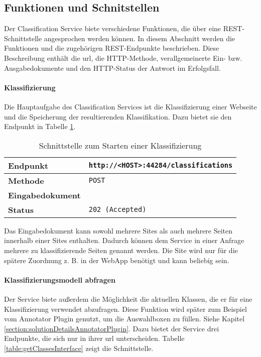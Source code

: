 \subsection{Funktionen und Schnitstellen}
    \label{section:solutionDetailsClassificationServiceFunctions}
    Der Classification Service biete verschiedene Funktionen,
    die über eine REST-Schnittstelle angesprochen werden können.
    In diesem Abschnitt werden die Funktionen und die zugehörigen
    REST-Endpunkte beschrieben.
    Diese Beschreibung enthält die \gls{url}, die HTTP-Methode,
    verallgemeinerte Ein- bzw. Ausgabedokumente und den HTTP-Status
    der Antwort im Erfolgsfall.

    \paragraph{Klassifizierung}
    Die Hauptaufgabe des Classification Services ist die Klassifizierung einer Webseite
    und die Speicherung der resultierenden Klassifikation.
    Dazu bietet sie den Endpunkt in Tabelle \ref{table:startClassificationInterface}.

    \begin{table}[htb]
        \centering
        \begin{tabular}{|l|l|}
        \hline
        \textbf{Endpunkt} & \texttt{http://<HOST>:44284/classifications}\\
        \hline
        \textbf{Methode} & \texttt{POST}\\
        \hline
        \textbf{Eingabedokument} & \\
        \hline
        \textbf{Status} & \texttt{202 (Accepted)}\\
        \hline
        \end{tabular}
        \caption{Schnittstelle zum Starten einer Klassifizierung}
        \label{table:startClassificationInterface}
    \end{table}

    Das Eingabedokument kann sowohl mehrere Sites als auch mehrere Seiten innerhalb einer Sites enthalten.
    Dadurch können dem Service in einer Anfrage mehrere zu klassifizierende Seiten genannt werden.
    Die Site wird nur für die spätere Zuordnung z. B. in der WebApp benötigt und kann beliebig sein.

    \paragraph{Klassifizierungsmodell abfragen}
    Der Service biete außerdem die Möglichkeit die aktuellen Klassen,
    die er für eine Klassifizierung verwendet abzufragen.
    Diese Funktion wird später zum Beispiel vom Annotator Plugin genutzt,
    um die Auswahlboxen zu füllen. Siehe Kapitel \ref{section:solutionDetailsAnnotatorPlugin}.
    Dazu bietet der Service drei Endpunkte, die sich nur in ihrer \gls{url} unterscheiden.
    Tabelle \ref{table:getClassesInterface} zeigt die Schnittstelle.


